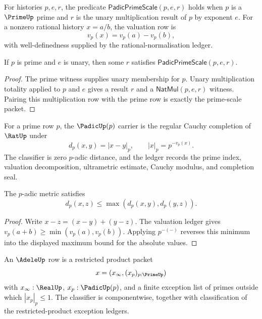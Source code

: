 \begin{definition}
\label{def:number-theory-spine-padic-scale}
For histories $p,e,r$, the predicate $\mathsf{PadicPrimeScale}(p,e,r)$ holds
when $p$ is a $\PrimeUp$ prime and $r$ is the unary multiplication result of
$p$ by exponent $e$.  For a nonzero rational history $x=a/b$, the valuation
row is
$$
v_p(x)=v_p(a)-v_p(b),
$$
with well-definedness supplied by the rational-normalisation ledger.
\end{definition}

\begin{theorem}
\label{thm:number-theory-spine-prime-scale-totality}
If $p$ is prime and $e$ is unary, then some $r$ satisfies
$\mathsf{PadicPrimeScale}(p,e,r)$.
\end{theorem}

\begin{proof}
The prime witness supplies unary membership for $p$.  Unary multiplication
totality applied to $p$ and $e$ gives a result $r$ and a
$\mathsf{NatMul}(p,e,r)$ witness.  Pairing this multiplication row with the
prime row is exactly the prime-scale packet.
\end{proof}

\begin{definition}
\label{def:number-theory-spine-padic-carrier}
For a prime row $p$, the $\PadicUp(p)$ carrier is the regular Cauchy
completion of $\RatUp$ under
$$
d_p(x,y)=|x-y|_p,\qquad |x|_p=p^{-v_p(x)}.
$$
The classifier is zero $p$-adic distance, and the ledger records the prime
index, valuation decomposition, ultrametric estimate, Cauchy modulus, and
completion seal.
\end{definition}

\begin{theorem}
\label{thm:number-theory-spine-ultrametric}
The $p$-adic metric satisfies
$$
d_p(x,z)\le\max(d_p(x,y),d_p(y,z)).
$$
\end{theorem}

\begin{proof}
Write $x-z=(x-y)+(y-z)$.  The valuation ledger gives
$v_p(a+b)\ge\min(v_p(a),v_p(b))$.  Applying $p^{-(-)}$ reverses this minimum
into the displayed maximum bound for the absolute values.
\end{proof}

\begin{definition}
\label{def:number-theory-spine-adele-carrier}
An $\AdeleUp$ row is a restricted product packet
$$
x=(x_\infty,(x_p)_{p:\PrimeUp})
$$
with $x_\infty:\RealUp$, $x_p:\PadicUp(p)$, and a finite exception list of
primes outside which $|x_p|_p\le1$.  The classifier is componentwise, together
with classification of the restricted-product exception ledgers.
\end{definition}

